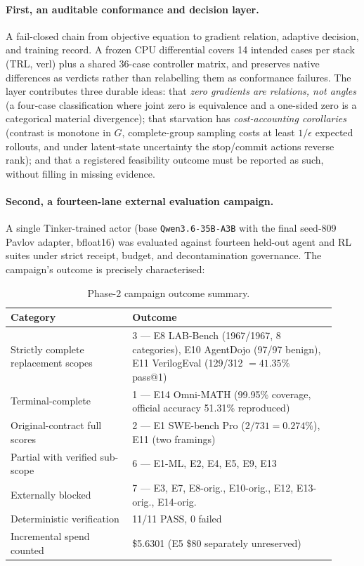 \paragraph{First, an auditable conformance and decision layer.} A fail-closed
chain from objective equation to gradient relation, adaptive decision, and
training record. A frozen CPU differential covers 14 intended cases per stack
(TRL, verl) plus a shared 36-case controller matrix, and preserves native
differences as verdicts rather than relabelling them as conformance failures. The
layer contributes three durable ideas: that \emph{zero gradients are relations,
not angles} (a four-case classification where joint zero is equivalence and a
one-sided zero is a categorical material divergence); that starvation has
\emph{cost-accounting corollaries} (contrast is monotone in $G$, complete-group
sampling costs at least $1/\epsilon$ expected rollouts, and under latent-state
uncertainty the stop/commit actions reverse rank); and that a registered
feasibility outcome must be reported as such, without filling in missing
evidence.

\paragraph{Second, a fourteen-lane external evaluation campaign.} A single
Tinker-trained actor (base \texttt{Qwen3.6-35B-A3B} with the final seed-809
Pavlov adapter, bfloat16) was evaluated against fourteen held-out agent and RL
suites under strict receipt, budget, and decontamination governance. The
campaign's outcome is precisely characterised:

\begin{table}[h]
  \centering
  \caption{Phase-2 campaign outcome summary.}
  \label{tab:outcome}
  \small
  \begin{tabular}{@{}L{0.34\linewidth}L{0.58\linewidth}@{}}
    \toprule
    \textbf{Category} & \textbf{Outcome} \\
    \midrule
    Strictly complete replacement scopes & 3 --- E8 LAB-Bench (1967/1967, 8 categories), E10 AgentDojo (97/97 benign), E11 VerilogEval (129/312 $=41.35\%$ pass@1) \\
    Terminal-complete & 1 --- E14 Omni-MATH (99.95\% coverage, official accuracy 51.31\% reproduced) \\
    Original-contract full scores & 2 --- E1 SWE-bench Pro ($2/731=0.274\%$), E11 (two framings) \\
    Partial with verified sub-scope & 6 --- E1-ML, E2, E4, E5, E9, E13 \\
    Externally blocked & 7 --- E3, E7, E8-orig., E10-orig., E12, E13-orig., E14-orig. \\
    Deterministic verification & 11/11 PASS, 0 failed \\
    Incremental spend counted & \$5.6301 (E5 \$80 separately unreserved) \\
    \bottomrule
  \end{tabular}
\end{table}

